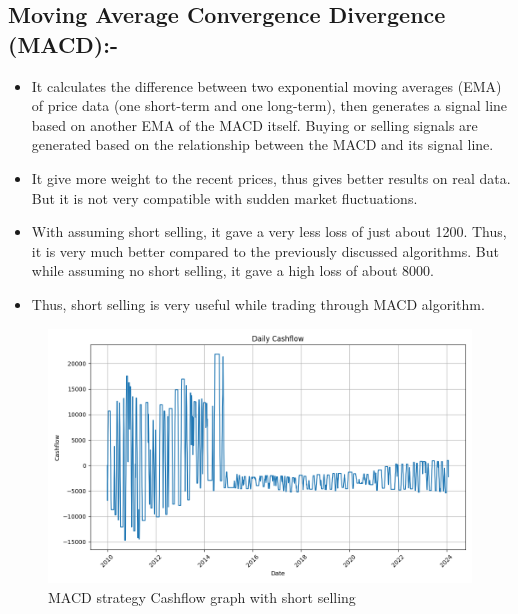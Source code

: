 \documentclass[11pt]{article}
\begin{document}
\subsection{Moving Average Convergence Divergence (MACD):-}
\begin{itemize}
    \item It calculates the difference between two exponential moving averages (EMA) of price data (one short-term and one long-term), then generates a signal line based on another EMA of the MACD itself. Buying or selling signals are generated based on the relationship between the MACD and its signal line.
    \item It give more weight to the recent prices, thus gives better results on real data. But it is not very compatible with sudden market fluctuations.
    \item With assuming short selling, it gave a very less loss of just about 1200. Thus, it is very much better compared to the previously discussed algorithms. But while assuming no short selling, it gave a high loss of about 8000.
    \item Thus, short selling is very useful while trading through MACD algorithm.
\end{itemize}

\begin{figure}[H]
  \centering
  \includegraphics[width=1\textwidth]{MACD_with_short.png}
  \caption{MACD strategy Cashflow graph with short selling}
\end{figure}
\end{document}
